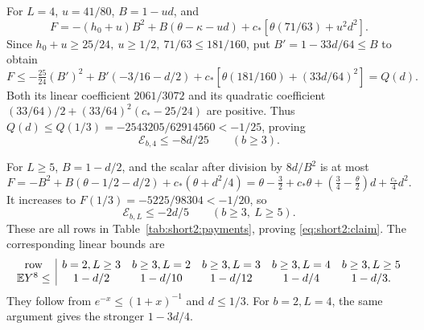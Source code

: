 For \(L=4\), \(u=41/80\), \(B=1-ud\), and
\[
 F=-(h_0+u)B^2+B(\theta-\kappa-ud)
                 +c_*[\theta(71/63)+u^2d^2].
\]
Since \(h_0+u\ge25/24,\ u\ge1/2,\ 71/63\le181/160\), put
\(B'=1-33d/64\le B\) to obtain
\[
 F\le-\tfrac{25}{24}(B')^2+B'(-3/16-d/2)
          +c_*[\theta(181/160)+(33d/64)^2]=Q(d).
\]
Both its linear coefficient \(2061/3072\) and its quadratic
coefficient \((33/64)/2+(33/64)^2(c_*-25/24)\) are positive.
Thus \(Q(d)\le Q(1/3)=-2543205/62914560<-1/25\), proving
\begin{equation}\label{eq:short2:longer-L4-paid}
 \mathcal E_{b,4}\le-8d/25\qquad(b\ge3).
\end{equation}

For \(L\ge5\), \(B=1-d/2\), and the scalar after division by
\(8d/B^2\) is at most
\[
 F=-B^2+B(\theta-1/2-d/2)+c_*(\theta+d^2/4)
 =\theta-\tfrac32+c_*\theta+
   (\tfrac34-\tfrac\theta2)d+\tfrac{c_*}{4}d^2 .
\]
It increases to \(F(1/3)=-5225/98304<-1/20\), so
\begin{equation}\label{eq:short2:longer-tail-paid}
 \mathcal E_{b,L}\le-2d/5\qquad(b\ge3,\ L\ge5).
\end{equation}
These are all rows in Table~\ref{tab:short2:payments}, proving
\eqref{eq:short2:claim}. The corresponding linear bounds are
\[
\begin{array}{c|ccccc}
\text{row}&b=2,L\ge3&b\ge3,L=2&b\ge3,L=3&b\ge3,L=4&b\ge3,L\ge5\\
\mathbb E Y^8\le&1-d/2&1-d/10&1-d/12&1-d/4&1-d/3 .
\end{array}
\]
They follow from \(e^{-x}\le(1+x)^{-1}\) and \(d\le1/3\).
For \(b=2,L=4\), the same argument gives the stronger \(1-3d/4\).
